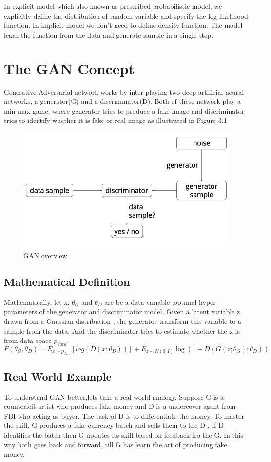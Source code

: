 In explicit model which also known as prescribed probabilistic model, we explicitly define the distribution of random variable and specify the log likelihood function.
In implicit model we don't need to define density function\cite{1}. The model learn the function from the data and generate sample in a single step.

\section{The GAN  Concept}
Generative Adversarial network works by inter playing two deep artificial neural networks, a generator(G) and a discriminator(D). Both of these network play a min max game, where generator tries to produce a fake image and discriminator tries to identify whether it is fake or real image as illustrated in Figure 3.1 
\begin{figure}[t]

  \centering
    \includegraphics[scale=.4, angle=0]{Files/gan-overview.png}
    \caption[GAN overview]{ GAN overview\cite{Gan-overview}}
    \label{fig: GAN-Overview}
\end{figure}
\newpage
\subsection{Mathematical Definition}
Mathematically, let x,  $\theta_{G}$  and $\theta_{D}$ are be a data variable ,optimal hyper-parameters of the generator and discriminator model. Given a latent variable z drawn from a Gaussian distribution  , the generator transform this variable to a sample from the data. And the discriminator tries to estimate whether the x is from data space $p_{data}$.
$$ F (\theta_{G}, \theta_{D}) = E_{x\sim p_{data}} [log (D (x; \theta_{D}))] + E_{z\sim N(0,I)}\log (1- D(G (z; \theta_{G}) ; \theta_{D}))$$
\subsection{Real World Example}
To understand GAN better,lets take a real world analogy. Suppose G is a counterfeit artist who produces fake money and D is a undercover agent from FBI who acting as buyer. The task of D is to differentiate the money. To master the skill, G produces a fake currency batch and sells them to the D . If D identifies the batch then G updates its skill based on feedback fro the G. In this way  both goes back and forward, till G has learn the art of producing fake money.




